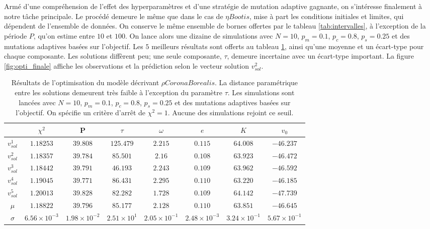 \documentclass{article}
\begin{document}
Armé d'une compréhension de l'effet des hyperparamètres et d'une stratégie de mutation adaptive gagnante, on s'intéresse finalement à notre tâche principale. Le procédé demeure le même que dans le cas de $\eta Bootis$, mise à part les conditions initiales et limites, qui dépendent de l'ensemble de données. On conserve le même ensemble de bornes offertes par le tableau \ref{tab:intervalles}, à l'exception de la période $P$, qu'on estime entre $10$ et $100$. On lance alors une dizaine de simulations avec $N=10$, $p_m=0.1$, $p_c=0.8$, $p_s=0.25$ et des mutations adaptives basées sur l'objectif. Les $5$ meilleurs résultats sont offerts au tableau \ref{tab:optimisation}, ainsi qu'une moyenne et un écart-type pour chaque composante. Les solutions diffèrent peu; une seule composante, $\tau$, demeure incertaine avec un écart-type important. La figure \ref{fig:opti_finale} affiche les observations et la prédiction selon le vecteur solution $v^2_{sol}$.

\begin{table}[H]
	\begin{center}
		\caption{Résultats de l'optimisation du modèle décrivant $\rho CoronaBorealis$. La distance paramétrique entre les solutions demeurent très faible à l'exception du paramètre $\tau$. Les simulations sont lancées avec $N=10$, $p_m=0.1$, $p_c=0.8$, $p_s=0.25$ et des mutations adaptives basées sur l'objectif. On spécifie un critère d'arrêt de $\chi^2=1$. Aucune des simulations rejoint ce seuil.}
		\label{tab:optimisation}
		\begin{tabular}{|c|c|c|c|c|c|c|c|} %
			\hline	
			& \textbf{$\chi^2$}  & \textbf{P} & \textbf{$\tau$} & \textbf{$\omega$} & \textbf{$e$}  & \textbf{$K$} & \textbf{$v_0$} \\\hline\hline
			$v^1_{sol}$ & $1.18253$ & $39.808$ & $125.479$ & $2.215$ & $0.115$ & $64.008$ & $-46.237$\\
			$v^2_{sol}$ & $1.18357$ & $39.784$ & $85.501$ & $2.16$ & $0.108$ & $63.923$ & $-46.472$\\
			$v^3_{sol}$ & $1.18442$ & $39.791$ & $46.193$ & $2.243$ & $0.109$ & $63.962$ & $-46.592$\\
			$v^4_{sol}$ & $1.19045$ & $39.771$ & $86.431$ & $2.295$ & $0.110$ & $63.220$ & $-46.185$\\
			$v^5_{sol}$ & $1.20013$ & $39.828$ & $82.282$ & $1.728$ & $0.109$ & $64.142$ & $-47.739$\\\hline\hline
			$\mu$ & $1.18822$ & $39.796$ & $85.177$ & $2.128$ & $0.110$ & $63.851$ & $-46.645$\\\hline
			$\sigma$ &  $6.56\times10^{-3}$ & $1.98\times10^{-2}$ & $2.51\times10^{1}$ & $2.05\times10^{-1}$ & $2.48\times10^{-3}$ & $3.24\times10^{-1}$ & $5.67\times10^{-1}$ \\\hline
		\end{tabular}
	\end{center}
\end{table}
\end{document}
